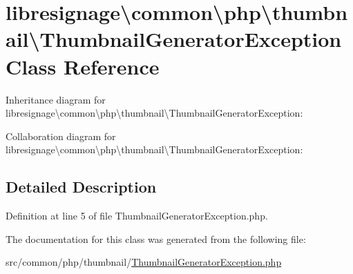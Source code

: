 \hypertarget{classlibresignage_1_1common_1_1php_1_1thumbnail_1_1ThumbnailGeneratorException}{}\section{libresignage\textbackslash{}common\textbackslash{}php\textbackslash{}thumbnail\textbackslash{}Thumbnail\+Generator\+Exception Class Reference}
\label{classlibresignage_1_1common_1_1php_1_1thumbnail_1_1ThumbnailGeneratorException}


Inheritance diagram for libresignage\textbackslash{}common\textbackslash{}php\textbackslash{}thumbnail\textbackslash{}Thumbnail\+Generator\+Exception\+:


Collaboration diagram for libresignage\textbackslash{}common\textbackslash{}php\textbackslash{}thumbnail\textbackslash{}Thumbnail\+Generator\+Exception\+:


\subsection{Detailed Description}


Definition at line 5 of file Thumbnail\+Generator\+Exception.\+php.



The documentation for this class was generated from the following file\+:\begin{DoxyCompactItemize}
\item 
src/common/php/thumbnail/\hyperlink{ThumbnailGeneratorException_8php}{Thumbnail\+Generator\+Exception.\+php}\end{DoxyCompactItemize}
